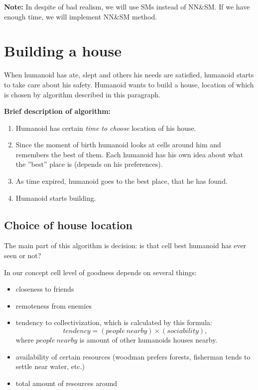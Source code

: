 \documentclass[12pt]{article}
\newcommand{\note}[1]{\textbf{\color{blue}Note:} #1}
\begin{document}
                \note{In despite of bad realism, we will use SMs instead of NN\&SM. If we have enough time, we will implement NN\&SM method.}

        \section{Building a house}
            When humanoid has ate, slept and others his needs are satisfied, humanoid starts to take care about his safety. Humanoid wants to build a house, location of which is chosen by algorithm described in this paragraph.

            \textbf{Brief description of algorithm:}
                \begin{enumerate}
                    \item Humanoid has certain \textit{time to choose} location of his house.
                    \item Since the moment of birth humanoid looks at cells around him and remembers the best of them. Each humanoid has his own idea about what the ''best'' place is (depends on his preferences).
                    \item As time expired, humanoid goes to the best place, that he has found.
                    \item Humanoid starts building.
                \end{enumerate}

            \subsection{Choice of house location}
                The main part of this algorithm is decision: is that cell best humanoid has ever seen or not?

                In our concept cell level of goodness depends on several things:
                    \begin{itemize}
                        \item closeness to friends
                        \item remoteness from enemies
                        \item tendency to collectivization, which is calculated by this formula:
                            $$tendency = (people ~ nearby) \times (sociability),$$
                        where $people ~ nearby$ is amount of other humanoids houses nearby.
                        \item availability of certain resources (woodman prefers forests, fisherman tends to settle near water, etc.)
                        \item total amount of resources around
                    \end{itemize}
\end{document}
